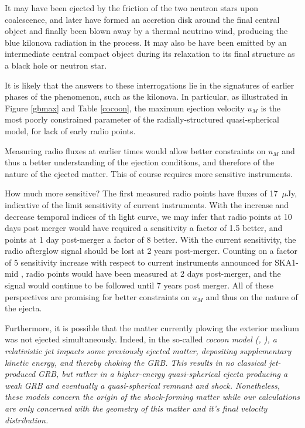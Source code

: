 It may have been ejected by the friction of the two neutron stars upon coalescence, and later have formed an accretion disk around the final central object and finally been blown away by a thermal neutrino wind, producing the blue kilonova radiation in the process. It may also be have been emitted by an intermediate central compact object during its relaxation to its final structure as a black hole or neutron star.

It is likely that the answers to these interrogations lie in the signatures of earlier phases of the phenomenon, such as the kilonova. In particular, as illustrated in Figure \ref{gbmax} and Table \ref{cocoon}, the maximum ejection velocity $u_M$ is the most poorly constrained parameter of the radially-structured quasi-spherical model, for lack of early radio points.


Measuring radio fluxes at earlier times would allow better constraints on $u_M$ and thus a better understanding of the ejection conditions, and therefore of the nature of the ejected matter. This of course requires more sensitive instruments.

How much more sensitive? The first measured radio points have fluxes of 17~$\mu$Jy, indicative of the limit sensitivity of current instruments. With the increase and decrease temporal indices of th light curve, we may infer that radio points at 10 days post merger would have required a sensitivity a factor of 1.5 better, and points at 1 day post-merger a factor of 8 better. With the current sensitivity, the radio afterglow signal should be lost at 2 years post-merger. Counting on a factor of 5 sensitivity increase with respect to current instruments announced for SKA1-mid \cite{62}, radio points would have been measured at 2 days post-merger, and the signal would continue to be followed until 7 years post merger. All of these perspectives are promising for better constraints on $u_M$ and thus on the nature of the ejecta.

Furthermore, it is possible that the matter currently plowing the exterior medium was not ejected simultaneously. Indeed, in the so-called \it{cocoon model} (\cite{42, 5}, ), a relativistic jet impacts some previously ejected matter, depositing supplementary kinetic energy, and thereby \it{choking} the GRB. This results in no classical jet-produced GRB, but rather in a higher-energy quasi-spherical ejecta producing a weak GRB and eventually a quasi-spherical remnant and shock. Nonetheless, these models concern the origin of the shock-forming matter while our calculations are only concerned with the geometry of this matter and it's final velocity distribution.


